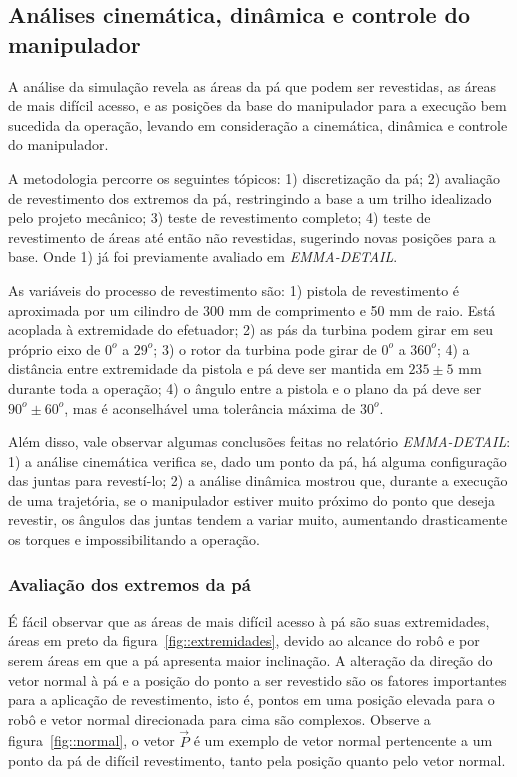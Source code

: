 \subsection{Análises cinemática, dinâmica e
controle do manipulador}

A análise da simulação revela as áreas da pá que podem ser revestidas,
as áreas de mais difícil acesso, e as posições da base do manipulador para a
execução bem sucedida da operação, levando em consideração a cinemática,
dinâmica e controle do manipulador. 

A metodologia percorre os seguintes tópicos: 1) discretização da pá; 2)
avaliação de revestimento dos extremos da pá, restringindo a base a um trilho
idealizado pelo projeto mecânico; 3) teste de revestimento completo; 4) teste de
revestimento de áreas até então não revestidas, sugerindo novas posições para a
base. Onde 1) já foi previamente avaliado em \textit{EMMA-DETAIL}. 

As variáveis do processo de revestimento são: 1) pistola de revestimento
é aproximada por um cilindro de 300 mm de comprimento e 50 mm de raio. Está
acoplada à extremidade do efetuador; 2) as pás da turbina podem girar em seu
próprio eixo de $0^o$ a $29^o$; 3) o rotor da turbina pode girar de
$0^o$ a $360^o$; 4) a distância entre extremidade da pistola e pá deve
ser mantida em $235 \pm 5$ mm durante toda a operação; 4) o ângulo entre a
pistola e o plano da pá deve ser $90^o \pm 60^o$, mas é aconselhável uma
tolerância máxima de $30^o$.

Além disso, vale observar algumas conclusões feitas no relatório
\textit{EMMA-DETAIL}: 1) a análise cinemática verifica se, dado um ponto da
pá, há alguma configuração das juntas para revestí-lo; 2) a análise dinâmica
mostrou que, durante a execução de uma trajetória, se o manipulador estiver
muito próximo do ponto que deseja revestir, os ângulos das juntas tendem a
variar muito, aumentando drasticamente os torques e impossibilitando a operação.


\subsubsection{Avaliação dos extremos da pá} 

É fácil observar que as áreas de mais difícil acesso à pá são suas extremidades,
áreas em preto da figura~\ref{fig::extremidades}, devido ao alcance do robô e
por serem áreas em que a pá apresenta maior inclinação. A alteração da direção
do vetor normal à pá e a posição do ponto a ser revestido são os fatores 
importantes para a aplicação de revestimento, isto é, pontos em uma posição
elevada para o robô e vetor normal direcionada para cima são complexos. Observe
a figura~\ref{fig::normal}, o vetor $\vec{P}$ é um exemplo de vetor normal
pertencente a um ponto da pá de difícil revestimento, tanto pela posição quanto
pelo vetor normal.

